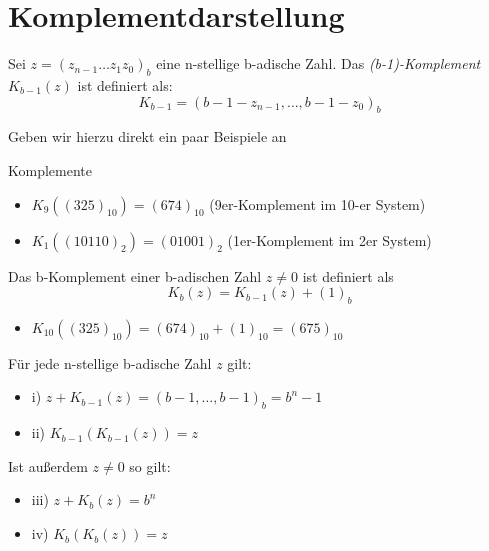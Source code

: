\section{Komplementdarstellung}

\begin{definition}[(b-1)-Komplement]
Sei $z=(z_{n-1}\ldots z_1 z_0)_b$ eine n-stellige b-adische Zahl. Das \emph{(b-1)-Komplement} $K_{b-1}(z)$ ist definiert als:
\[
K_{b-1} = (b-1-z_{n-1},\ldots, b-1-z_0)_b
\]
\end{definition}
Geben wir hierzu direkt ein paar Beispiele an
\begin{example} Komplemente \\
\begin{itemize}
	\item $K_9((325)_{10})= (674)_{10}$  (9er-Komplement im 10-er System)
	\item $K_1((10110)_2)=(01001)_2$ (1er-Komplement im 2er System)
\end{itemize}
\end{example}
\begin{definition}[b-Komplement]
Das b-Komplement einer b-adischen Zahl $z\neq 0$ ist definiert als \[
K_b(z)=K_{b-1}(z) +(1)_b
\]
\end{definition}
\begin{example}
\begin{itemize}
	\item $K_{10}((325)_{10}) = (674)_{10} + (1)_{10} = (675)_{10}$
\end{itemize}
\end{example}
\begin{lemma}[]
Für jede n-stellige b-adische Zahl $z$ gilt:
\begin{itemize}
	
	\item i) $z+K_{b-1}(z)=(b-1,\ldots,b-1)_b = b^{n}-1$
	\item ii) $K_{b-1}\left( K_{b-1}(z) \right)=z$
\end{itemize}
Ist außerdem $z\neq 0$ so gilt:
\begin{itemize}
	
	\item iii) $z+K_b(z)=b^{n}$
	\item iv) $K_b(K_b(z))=z$
\end{itemize}
\end{lemma}
